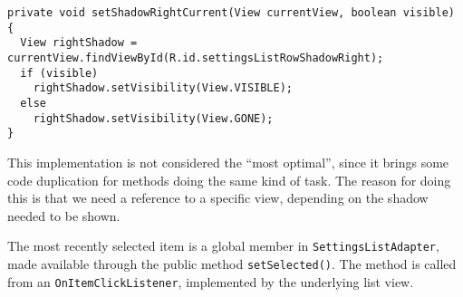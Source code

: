 \begin{lstlisting}[caption={One of three methods setting the visibility of shadows related to the selected list item.}, label={lst:settingslistadapter:shadow}]
private void setShadowRightCurrent(View currentView, boolean visible) {
  View rightShadow = currentView.findViewById(R.id.settingsListRowShadowRight);
  if (visible)
    rightShadow.setVisibility(View.VISIBLE);
  else
    rightShadow.setVisibility(View.GONE);
}
\end{lstlisting}

This implementation is not considered the ``most optimal'', since it brings some code duplication for methods doing the same kind of task.
The reason for doing this is that we need a reference to a specific view, depending on the shadow needed to be shown.

The most recently selected item is a global member in \lstinline|SettingsListAdapter|, made available through the public method \lstinline|setSelected()|.
The method is called from an \lstinline|OnItemClickListener|, implemented by the underlying list view.